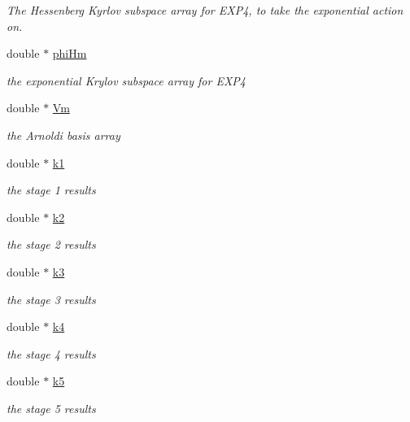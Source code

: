\begin{DoxyCompactItemize}
\begin{DoxyCompactList}\small\item\em The Hessenberg Kyrlov subspace array for E\+X\+P4, to take the exponential action on. \end{DoxyCompactList}\item 
double $\ast$ \hyperlink{structexp4cu_1_1solver__memory_a3278cfbb9029ad325ca304b995097c64}{phi\+Hm}
\begin{DoxyCompactList}\small\item\em the exponential Krylov subspace array for E\+X\+P4 \end{DoxyCompactList}\item 
double $\ast$ \hyperlink{structexp4cu_1_1solver__memory_a089d1909b39f39551063214762c66e08}{Vm}
\begin{DoxyCompactList}\small\item\em the Arnoldi basis array \end{DoxyCompactList}\item 
double $\ast$ \hyperlink{structexp4cu_1_1solver__memory_a184c23b8411b8772b53dae0e6fe99723}{k1}
\begin{DoxyCompactList}\small\item\em the stage 1 results \end{DoxyCompactList}\item 
double $\ast$ \hyperlink{structexp4cu_1_1solver__memory_a8f4b3ca501187945e4620f44506f6882}{k2}
\begin{DoxyCompactList}\small\item\em the stage 2 results \end{DoxyCompactList}\item 
double $\ast$ \hyperlink{structexp4cu_1_1solver__memory_ad874f97ba264e3cefb19482eef2a729d}{k3}
\begin{DoxyCompactList}\small\item\em the stage 3 results \end{DoxyCompactList}\item 
double $\ast$ \hyperlink{structexp4cu_1_1solver__memory_a060f44ce2caacb3fc536671b591e11a2}{k4}
\begin{DoxyCompactList}\small\item\em the stage 4 results \end{DoxyCompactList}\item 
double $\ast$ \hyperlink{structexp4cu_1_1solver__memory_a749746fa09b01076ee56c0402d003fb7}{k5}
\begin{DoxyCompactList}\small\item\em the stage 5 results \end{DoxyCompactList}\item 

\end{DoxyCompactItemize}
